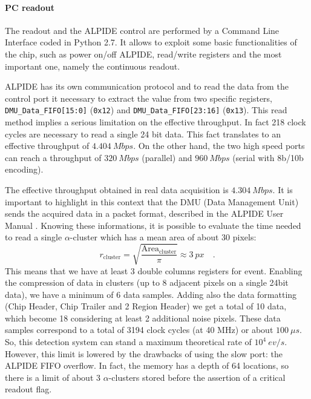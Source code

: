 \documentclass[../../main/main.tex]{subfiles}
\begin{document}
\paragraph{PC readout}
The readout and the ALPIDE control are performed by a Command Line Interface coded in Python 2.7. It allows to exploit some basic functionalities of the chip, such as power on/off ALPIDE, read/write registers and the most important one, namely the continuous readout.

ALPIDE has its own communication protocol and to read the data from the control port it necessary to extract the value from two specific registers, \texttt{DMU\_Data\_FIFO[15:0]} (\texttt{0x12}) and \texttt{DMU\_Data\_FIFO[23:16]} (\texttt{0x13}).
This read method implies a serious limitation on the effective throughput. In fact 218 clock cycles are necessary to read a single 24 bit data. This fact translates to an effective throughput of \( 4.404 \ \si{Mbps} \). On the other hand, the two high speed ports can reach a throughput of \( 320 \ \si{Mbps} \) (parallel) and \( 960 \ \si{Mbps} \) (serial with 8b/10b encoding). 

The effective throughput obtained in real data acquisition is \( 4.304 \ \si{Mbps} \). It is important to highlight in this context that the DMU (Data Management Unit) sends the acquired data in a packet format, described in the ALPIDE User Manual \cite{Manual_ALP}. Knowing these informations, it is possible to evaluate the time needed to read a single $\alpha$-cluster which has a mean area of about 30 pixels:
\begin{equation}
    r_{\mathrm{cluster}}
    =
    \sqrt{\frac{\mathrm{Area}_{\mathrm{cluster}}}{\pi}}
    \approx
    3 \ \si{px}
    \quad .
\end{equation}
This means that we have at least 3 double columns registers for event.
Enabling the compression of data in clusters (up to 8 adjacent pixels on a single 24bit data), we have a minimum of 6 data samples. Adding also the data formatting (Chip Header, Chip Trailer and 2 Region Header) we get a total of 10 data, which become 18 considering at least 2 additional noise pixels. These data samples correspond to a total of 3194 clock cycles (at 40 MHz) or about \( 100 \ \si{\mu s} \). So, this detection system can stand a maximum theoretical rate of \( 10^{4} \ \si{ev/s} \).
However, this limit is lowered by the drawbacks of using the slow port: the ALPIDE FIFO overflow. In fact, the memory has a depth of 64 locations, so there is a limit of about 3 $\alpha$-clusters stored before the assertion of a critical readout flag.
\end{document}
